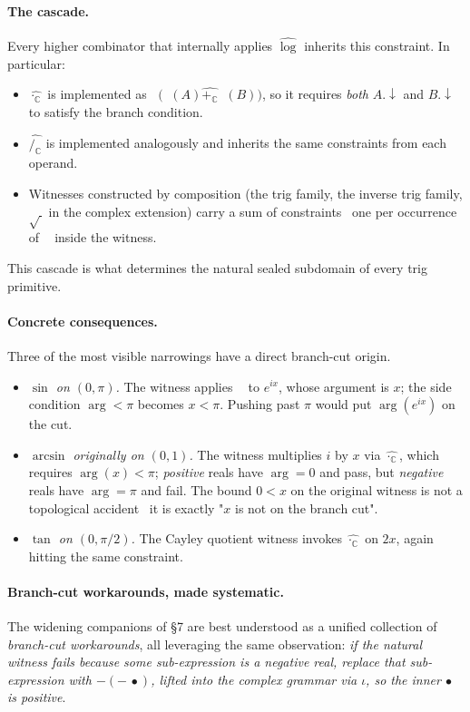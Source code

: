 \documentclass[11pt]{article}
\newcommand{\hexp}{\mathop{\widehat{\exp}}}
\newcommand{\hlogC}{\mathop{\widehat{\log_{\!\mathbb{C}}}}}
\newcommand{\haddC}{\mathbin{\widehat{+_{\!\mathbb{C}}}}}
\newcommand{\hmulC}{\mathbin{\widehat{\cdot_{\!\mathbb{C}}}}}
\newcommand{\hdivC}{\mathbin{\widehat{/_{\!\mathbb{C}}}}}
\theoremstyle{plain}
\theoremstyle{definition}
\begin{document}
\paragraph{The cascade.}
Every higher combinator that internally applies $\widehat{\log}$
inherits this constraint. In particular:
\begin{itemize}[topsep=2pt, itemsep=2pt]
  \item $\hmulC$ is implemented as
    $\hexp\!\bigl(\hlogC(A) \haddC \hlogC(B)\bigr)$, so it requires
    \emph{both} $A.\!\!\downarrow$ and $B.\!\!\downarrow$ to satisfy the
    branch condition.
  \item $\hdivC$ is implemented analogously and inherits the same
    constraints from each operand.
  \item Witnesses constructed by composition (the trig family, the
    inverse trig family, $\sqrt{\,}$ in the complex extension) carry
    a sum of constraints \textemdash\ one per occurrence of $\hlogC$
    inside the witness.
\end{itemize}
This cascade is what determines the natural sealed subdomain of every
trig primitive.

\paragraph{Concrete consequences.}
Three of the most visible narrowings have a direct branch-cut origin.
\begin{itemize}[topsep=2pt, itemsep=4pt]
  \item \emph{$\sin$ on $(0, \pi)$.} The witness applies $\hlogC$ to
    $e^{ix}$, whose argument is $x$; the side condition $\arg < \pi$
    becomes $x < \pi$. Pushing past $\pi$ would put $\arg(e^{ix})$ on
    the cut.
  \item \emph{$\arcsin$ originally on $(0, 1)$.} The witness multiplies
    $i$ by $x$ via $\hmulC$, which requires $\arg(x) < \pi$;
    \emph{positive} reals have $\arg = 0$ and pass, but \emph{negative}
    reals have $\arg = \pi$ and fail. The bound $0 < x$ on the original
    witness is not a topological accident \textemdash\ it is exactly
    "$x$ is not on the branch cut".
  \item \emph{$\tan$ on $(0, \pi/2)$.} The Cayley quotient witness
    invokes $\hmulC$ on $2x$, again hitting the same constraint.
\end{itemize}

\paragraph{Branch-cut workarounds, made systematic.}
The widening companions of \S7 are best understood as a unified
collection of \emph{branch-cut workarounds}, all leveraging the same
observation: \emph{if the natural witness fails because some
sub-expression is a negative real, replace that sub-expression with
$-(-\,\bullet)$, lifted into the complex grammar via $\iota$, so the
inner $\bullet$ is positive}.
\end{document}

